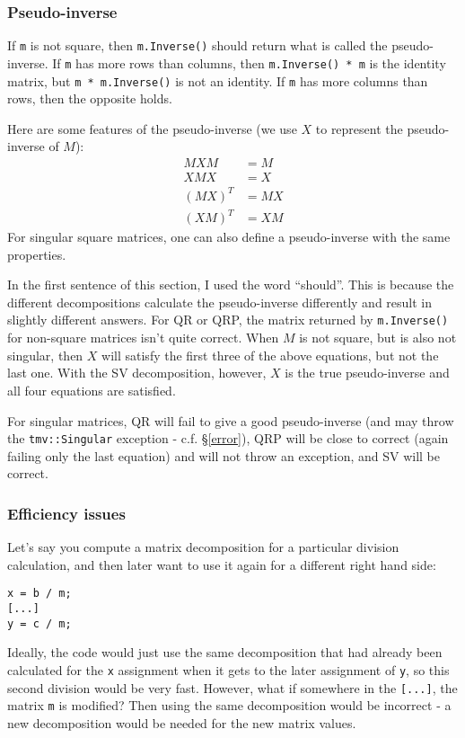 \documentclass[twoside,letterpaper,11pt]{article}
\renewcommand{\tt}[1]{{\texttt {#1}}}
\begin{document}
\subsubsection{Pseudo-inverse}
\label{pseudoinverse}

If \tt{m} is not square, then \tt{m.Inverse()} should return what is called the pseudo-inverse.
If \tt{m} has more rows than columns, then \tt{m.Inverse() * m} is the identity matrix, 
but \tt{m * m.Inverse()}
is not an identity.  If \tt{m} has more columns than rows, then the opposite holds.

Here are some features of the pseudo-inverse (we use $X$ to represent the pseudo-inverse
of $M$):
\begin{align*}
M X M &= M \\
X M X &= X \\
(M X)^T &= M X \\
(X M)^T &= X M 
\end{align*}
For singular square matrices, 
one can also define a pseudo-inverse with the same properties.

In the first sentence of this section, I used the word ``should''.  
This is because the different decompositions calculate the pseudo-inverse 
differently and result in slightly
different answers.  For QR or QRP, the matrix returned by \tt{m.Inverse()} for
non-square matrices isn't
quite correct.  When $M$ is not square, but is also not singular, then $X$
will satisfy the first three of the above equations,
but not the last one.  With the SV decomposition, however,
$X$ is the true pseudo-inverse and all four equations are satisfied.

For singular matrices, QR will fail to give a good pseudo-inverse (and may throw the
\tt{tmv::Singular} exception - c.f. \S\ref{error}), QRP will be close to correct
(again failing only the last equation) and will not throw an exception, and SV will be correct.

\subsubsection{Efficiency issues}
\label{efficiency}

Let's say you compute a matrix decomposition for a particular division calculation, and
then later want to use it again for a different right hand side:
\begin{verbatim}
x = b / m;
[...]
y = c / m;
\end{verbatim}
Ideally, the code would just use the same decomposition that had already been calculated
for the \tt{x} assignment when it gets to the later assignment of \tt{y}, 
so this second division would be very fast.
However, what if somewhere in the \tt{[...]}, the matrix \tt{m} is modified?  
Then using
the same decomposition would be incorrect - a new decomposition would be needed
for the new matrix values.
\end{document}
